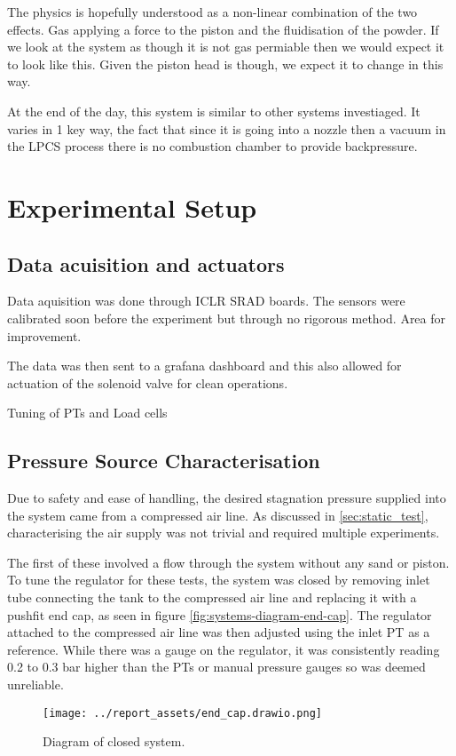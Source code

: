 The physics is hopefully understood as a non-linear combination of the two effects. Gas applying a force to the piston and the fluidisation of the powder. If we look at the system as though it is not gas permiable then we would expect it to look like this. Given the piston head is though, we expect it to change in this way.

At the end of the day, this system is similar to other systems investiaged. It varies in 1 key way, the fact that since it is going into a nozzle then a vacuum in the LPCS process there is no combustion chamber to provide backpressure.
\newpage

\section{Experimental Setup}
\subsection{Data acuisition and actuators}
Data aquisition was done through ICLR SRAD boards. The sensors were calibrated soon before the experiment but through no rigorous method. Area for improvement.

The data was then sent to a grafana dashboard and this also allowed for actuation of the solenoid valve for clean operations.

Tuning of PTs and Load cells
\subsection{Pressure Source Characterisation}
Due to safety and ease of handling, the desired stagnation pressure supplied into the system came from a compressed air line. As discussed in \autoref{sec:static_test}, characterising the air supply was not trivial and required multiple experiments. 

The first of these involved a flow through the system without any sand or piston. To tune the regulator for these tests, the system was closed by removing inlet tube connecting the tank to the compressed air line and replacing it with a pushfit end cap, as seen in figure \autoref{fig:systems-diagram-end-cap}. The regulator attached to the compressed air line was then adjusted using the inlet PT as a reference. While there was a gauge on the regulator, it was consistently reading 0.2 to 0.3 bar higher than the PTs or manual pressure gauges so was deemed unreliable. 
\begin{figure}[htbp]
    \centering
    \begin{minipage}{0.45\textwidth}
        \centering
        \texttt{[image: ../report\_assets/end\_cap.drawio.png]}
        \caption{Diagram of closed system.}\label{fig:systems-diagram-end-cap}
    \end{minipage}
\end{figure}

